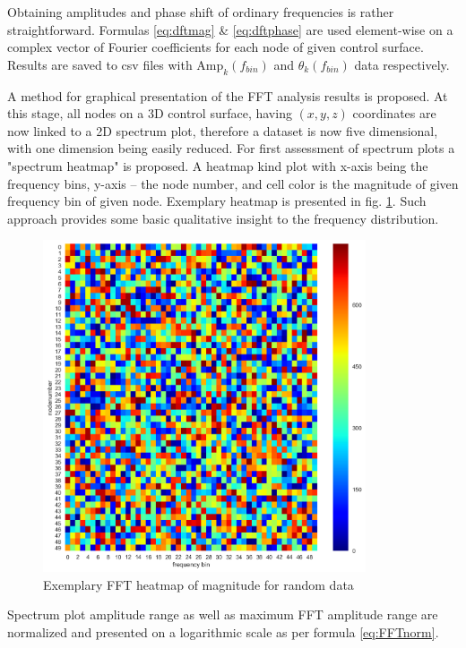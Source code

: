 Obtaining amplitudes and phase shift of ordinary frequencies is rather straightforward. Formulas \ref{eq:dftmag} \& \ref{eq:dftphase} are used element-wise on a complex vector of Fourier coefficients for each node of given control surface. Results are saved to csv files with $\text{Amp}_k(f_{bin})$ and $\theta_k(f_{bin})$ data respectively.

A method for graphical presentation of the FFT analysis results is proposed. At this stage, all nodes on a 3D control surface, having $(x, y, z)$ coordinates are now linked to a 2D spectrum plot, therefore a dataset is now five dimensional, with one dimension being easily reduced. For first assessment of spectrum plots a "spectrum heatmap" is proposed. A heatmap kind plot with x-axis being the frequency bins, y-axis -- the node number, and cell color is the magnitude of given frequency bin of given node. Exemplary heatmap is presented in fig. \ref{fft_heat}. Such approach provides some basic qualitative insight to the frequency distribution.

\begin{figure}[h!]
\centering %
\includegraphics[width=0.85\textwidth]{Pictures/fft_heat.png}
\caption{Exemplary FFT heatmap of magnitude for random data}
\label{fft_heat}
\end{figure}

Spectrum plot amplitude range as well as maximum FFT amplitude range are normalized and presented on a logarithmic scale as per formula \ref{eq:FFTnorm}. 

